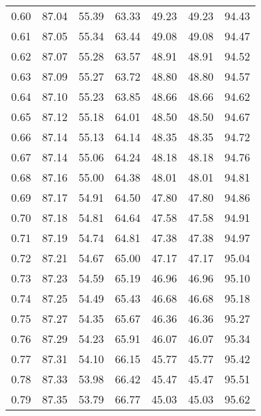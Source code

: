 \begin{tabular}{|c|c|c|c|c|c|c|}
      0.60 &     87.04 &     55.39 &      63.33 &   49.23 &      49.23 &         94.43 \\
      0.61 &     87.05 &     55.34 &      63.44 &   49.08 &      49.08 &         94.47 \\
      0.62 &     87.07 &     55.28 &      63.57 &   48.91 &      48.91 &         94.52 \\
      0.63 &     87.09 &     55.27 &      63.72 &   48.80 &      48.80 &         94.57 \\
      0.64 &     87.10 &     55.23 &      63.85 &   48.66 &      48.66 &         94.62 \\
      0.65 &     87.12 &     55.18 &      64.01 &   48.50 &      48.50 &         94.67 \\
      0.66 &     87.14 &     55.13 &      64.14 &   48.35 &      48.35 &         94.72 \\
      0.67 &     87.14 &     55.06 &      64.24 &   48.18 &      48.18 &         94.76 \\
      0.68 &     87.16 &     55.00 &      64.38 &   48.01 &      48.01 &         94.81 \\
      0.69 &     87.17 &     54.91 &      64.50 &   47.80 &      47.80 &         94.86 \\
      0.70 &     87.18 &     54.81 &      64.64 &   47.58 &      47.58 &         94.91 \\
      0.71 &     87.19 &     54.74 &      64.81 &   47.38 &      47.38 &         94.97 \\
      0.72 &     87.21 &     54.67 &      65.00 &   47.17 &      47.17 &         95.04 \\
      0.73 &     87.23 &     54.59 &      65.19 &   46.96 &      46.96 &         95.10 \\
      0.74 &     87.25 &     54.49 &      65.43 &   46.68 &      46.68 &         95.18 \\
      0.75 &     87.27 &     54.35 &      65.67 &   46.36 &      46.36 &         95.27 \\
      0.76 &     87.29 &     54.23 &      65.91 &   46.07 &      46.07 &         95.34 \\
      0.77 &     87.31 &     54.10 &      66.15 &   45.77 &      45.77 &         95.42 \\
      0.78 &     87.33 &     53.98 &      66.42 &   45.47 &      45.47 &         95.51 \\
      0.79 &     87.35 &     53.79 &      66.77 &   45.03 &      45.03 &         95.62 \\

\end{tabular}
